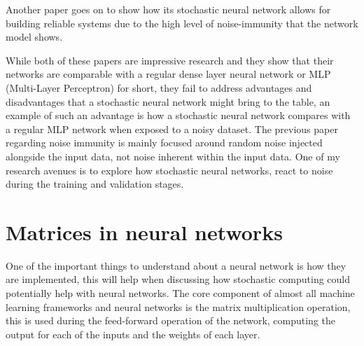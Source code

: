\documentclass[a4paper,oneside,phd,etd]{BYUPhys}
\begin{document}
Another paper\cite{7093194} goes on to show how its stochastic neural network allows for building reliable systems due to the high level of noise-immunity that the network model shows.

While both of these papers are impressive research and they show that their networks are comparable with a regular dense layer neural network or MLP (Multi-Layer Perceptron) for short, they fail to address advantages and disadvantages that a stochastic neural network might bring to the table, an example of such an advantage is how a stochastic neural network compares with a regular MLP network when exposed to a noisy dataset. The previous paper regarding noise immunity is mainly focused around random noise injected alongside the input data, not noise inherent within the input data. One of my research avenues is to explore how stochastic neural networks, react to noise during the training and validation stages.

\section{Matrices in neural networks}
One of the important things to understand about a neural network is how they are implemented, this will help when discussing how stochastic computing could potentially help with neural networks. The core component of almost all machine learning frameworks and neural networks is the matrix multiplication operation, this is used during the feed-forward operation of the network, computing the output for each of the inputs and the weights of each layer.
\end{document}
